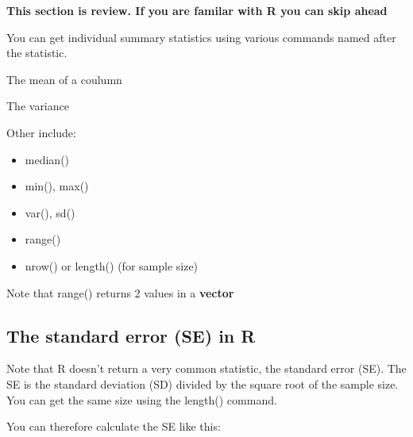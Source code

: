 \documentclass[]{book}
\newenvironment{Shaded}{\begin{snugshade}}{\end{snugshade}}
\newcommand{\KeywordTok}[1]{\textcolor[rgb]{0.13,0.29,0.53}{\textbf{#1}}}
\newcommand{\OperatorTok}[1]{\textcolor[rgb]{0.81,0.36,0.00}{\textbf{#1}}}
\newcommand{\NormalTok}[1]{#1}
\providecommand{\tightlist}{%
  \setlength{\itemsep}{0pt}\setlength{\parskip}{0pt}}
\theoremstyle{definition}
\theoremstyle{definition}
\theoremstyle{definition}
\theoremstyle{remark}
\begin{document}
\textbf{This section is review. If you are familar with R you can skip
ahead}

You can get individual summary statistics using various commands named
after the statistic.

The mean of a coulumn

\begin{Shaded}
\end{Shaded}

The variance

\begin{Shaded}
\end{Shaded}

Other include:

\begin{itemize}
\tightlist
\item
  median()
\item
  min(), max()
\item
  var(), sd()
\item
  range()
\item
  nrow() or length() (for sample size)
\end{itemize}

Note that range() returns 2 values in a \textbf{vector}

\begin{Shaded}
\end{Shaded}

\subsection{The standard error (SE) in
R}\label{the-standard-error-se-in-r}

Note that R doesn't return a very common statistic, the standard error
(SE). The SE is the standard deviation (SD) divided by the square root
of the sample size. You can get the same size using the length()
command.

You can therefore calculate the SE like this:
\end{document}
